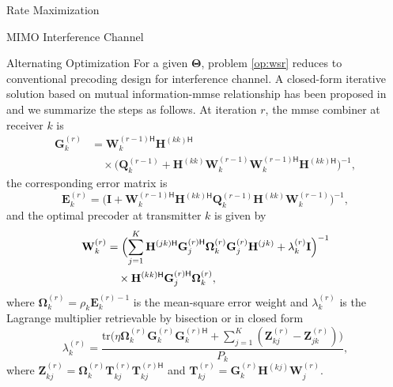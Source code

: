 \documentclass[journal]{IEEEtran}
\begin{document}
\begin{section}{Rate Maximization}
\begin{subsection}{MIMO Interference Channel}
\begin{subsubsection}{Alternating Optimization}
				For a given $\mathbf{\Theta}$, problem \eqref{op:wsr} reduces to conventional precoding design for interference channel.
				A closed-form iterative solution based on mutual information-\gls{mmse} relationship has been proposed in \cite{Shin2012,Negro2010} and we summarize the steps as follows.
				At iteration $r$, the \gls{mmse} combiner at receiver $k$ is
				\begin{equation}
					\begin{split}
						\mathbf{G}_k^{(r)} &= {\mathbf{W}_k^{(r-1)\mathsf{H}}} {\mathbf{H}^{(kk)\mathsf{H}}} \\
						& \quad \times \bigl(\mathbf{Q}_k^{(r-1)} + {\mathbf{H}^{(kk)}} \mathbf{W}_k^{(r-1)} {\mathbf{W}_k^{(r-1)\mathsf{H}}} {\mathbf{H}^{(kk)\mathsf{H}}}\bigr)^{-1},
					\end{split}
				\end{equation}
				the corresponding error matrix is
				\begin{equation}
					\mathbf{E}_k^{(r)} = \bigl(\mathbf{I} + {\mathbf{W}_k^{(r-1)\mathsf{H}}} {\mathbf{H}^{(kk)\mathsf{H}}} \mathbf{Q}_k^{(r-1)} {\mathbf{H}^{(kk)}} \mathbf{W}_k^{(r-1)}\bigr)^{-1},
				\end{equation}
				and the optimal precoder at transmitter $k$ is given by
				\begin{equation}
					\label{eq:precoder_wsr}
					\begin{split}
						\mathbf{W}_k^{(r)} & = \Bigl(\sum_{j=1}^K {\mathbf{H}^{(jk)\mathsf{H}}} {\mathbf{G}_j^{(r)\mathsf{H}}} \mathbf{\Omega}_k^{(r)} \mathbf{G}_j^{(r)} \mathbf{H}^{(jk)} + \lambda_k^{(r)} \mathbf{I} \Bigr)^{-1} \\
						& \quad \times {\mathbf{H}^{(kk)\mathsf{H}}} {\mathbf{G}_j^{(r)\mathsf{H}}} \mathbf{\Omega}_k^{(r)},
					\end{split}
				\end{equation}
				where $\mathbf{\Omega}_k^{(r)} = \rho_k {\mathbf{E}_k^{(r)-1}}$ is the mean-square error weight and $\lambda_k^{(r)}$ is the Lagrange multiplier retrievable by bisection \cite{Shin2012} or in closed form \cite{Negro2010}
				\begin{equation}
					\lambda_k^{(r)} = \frac{\mathrm{tr}\bigl(\eta \mathbf{\Omega}_k^{(r)} \mathbf{G}_k^{(r)}{\mathbf{G}_k^{(r)\mathsf{H}}} + \sum_{j=1}^K (\mathbf{Z}_{kj}^{(r)} - \mathbf{Z}_{jk}^{(r)}) \bigr)}{P_k},
				\end{equation}
				where $\mathbf{Z}_{kj}^{(r)} = \mathbf{\Omega}_k^{(r)}\mathbf{T}_{kj}^{(r)} {\mathbf{T}_{kj}^{(r)\mathsf{H}}}$ and $\mathbf{T}_{kj}^{(r)} = \mathbf{G}_k^{(r)} {\mathbf{H}^{(kj)}} \mathbf{W}_j^{(r)}$.


\end{subsubsection}
\end{subsection}
\end{section}
\end{document}
